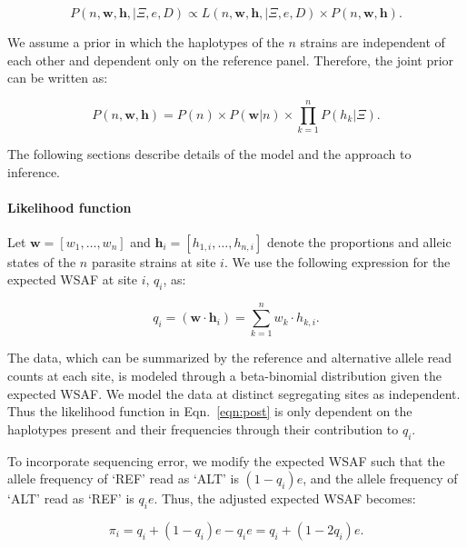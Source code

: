 \documentclass{nature}
\begin{document}
\begin{equation}
P(n, \mathbf{w}, \mathbf{h}, | \Xi, e, D) \propto L(n, \mathbf{w}, \mathbf{h}, | \Xi, e, D) \times P(n, \mathbf{w}, \mathbf{h}). \label{eqn:post}
\end{equation}

\noindent We assume a prior in which the haplotypes of the $n$ strains are independent of each other and dependent only on the reference panel.  Therefore, the joint prior can be written as:

\begin{equation}
P(n, \mathbf{w}, \mathbf{h}) = P(n) \times P(\mathbf{w} | n) \times \prod_{k=1}^{n} P(h_k | \Xi).
\end{equation}

\noindent The following sections describe details of the model and the approach to inference.


\paragraph{Likelihood function}

Let $\mathbf w = [w_1,\dots, w_n]$ and $\mathbf{h}_i = [h_{1,i},\dots,h_{n,i}]$ denote the proportions and alleic states of the $n$ parasite strains at site $i$. We use the following expression\cite{Jack2016} for the expected WSAF at site $i$, $q_{i}$, as:

\begin{equation}
q_i= (\mathbf{w}\cdot\mathbf{h}_{i})  =  \sum_{k=1}^{n} w_k \cdot h_{k,i} .\label{eqn:qij_full_sum}
\end{equation}

\noindent The data, which can be summarized by the reference and alternative allele read counts at each site, is modeled through a beta-binomial distribution given the expected WSAF.  We model the data at distinct segregating sites as independent.  Thus the likelihood function  in Eqn.~\eqref{eqn:post} is only dependent on the haplotypes present and their frequencies through their contribution to $q_{i}$.


To incorporate sequencing error, we modify the expected WSAF such that the allele frequency of `REF' read as `ALT' is $(1 - q_i)e$, and the allele frequency of `ALT' read as `REF' is $q_ie$. Thus, the adjusted expected WSAF becomes:

\begin{equation}
\pi_i = q_i + (1 - q_i)e - q_ie = q_i + (1 - 2q_i)e.\label{eqn:adj_q}
\end{equation}
\end{document}
